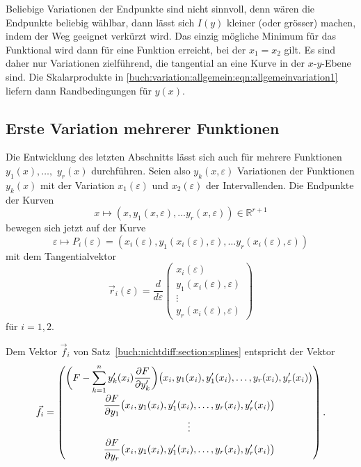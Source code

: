 Beliebige Variationen der Endpunkte sind nicht sinnvoll, denn
wären die Endpunkte beliebig wählbar, dann lässt sich $I(y)$ kleiner
(oder grösser) machen, indem der Weg geeignet verkürzt wird.
Das einzig mögliche Minimum für das Funktional wird dann für eine
Funktion erreicht, bei der $x_1=x_2$ gilt.
Es sind daher nur Variationen zielführend, die tangential an eine
Kurve in der $x$-$y$-Ebene sind.
Die Skalarprodukte in 
\eqref{buch:variation:allgemein:eqn:allgemeinvariation1}
liefern dann Randbedingungen für $y(x)$.

%
%
\subsection{Erste Variation mehrerer Funktionen
\label{buch:variation:allgemein:subsection:var1n}}
Die Entwicklung des letzten Abschnitts lässt sich auch für mehrere
Funktionen $y_1(x),\dots,$ $y_r(x)$ durchführen.
Seien also $y_k(x,\varepsilon)$ Variationen der Funktionen $y_k(x)$
mit der Variation $x_1(\varepsilon)$ und $x_2(\varepsilon)$ der 
Intervallenden.
Die Endpunkte der Kurven
\[
x
\mapsto
(x,
y_1(x,\varepsilon),\dots
y_r(x,\varepsilon))
\in \mathbb{R}^{r+1}
\]
bewegen sich jetzt auf der Kurve
\[
\varepsilon
\mapsto
P_i(\varepsilon)
=
(x_i(\varepsilon),
y_1(x_i(\varepsilon),\varepsilon),
\dots
y_r(x_i(\varepsilon),\varepsilon))
\]
mit dem Tangentialvektor
\[
\vec{r}_i(\varepsilon)
=
\frac{d}{d\varepsilon}
\begin{pmatrix}
x_i(\varepsilon)\\
y_1(x_i(\varepsilon),\varepsilon)\\
\vdots\\
y_r(x_i(\varepsilon),\varepsilon)
\end{pmatrix}
\]
für $i=1,2$.

Dem Vektor $\vec{f}_i$
von Satz~\ref{buch:nichtdiff:section:splines}
entspricht der Vektor
\[
\vec{f}_i
=
\renewcommand{\arraystretch}{1.8}
\begin{pmatrix}
\displaystyle
\biggl(
F%
-
\sum_{k=1}^n y'_k(x_i) \frac{\partial F}{\partial y_k'}
\biggr)
\bigl(x_i,y_1(x_i),y'_1(x_i),\dots,y_r(x_i),y_r'(x_i)\bigr)
\\
\displaystyle
\frac{\partial F}{\partial y_1}
\bigl(x_i,y_1(x_i),y'_1(x_i),\dots,y_r(x_i),y_r'(x_i)\bigr)
\\
\vdots
\\
\displaystyle
\frac{\partial F}{\partial y_r}
\bigl(x_i,y_1(x_i),y'_1(x_i),\dots,y_r(x_i),y_r'(x_i)\bigr)
\end{pmatrix}.
\]

